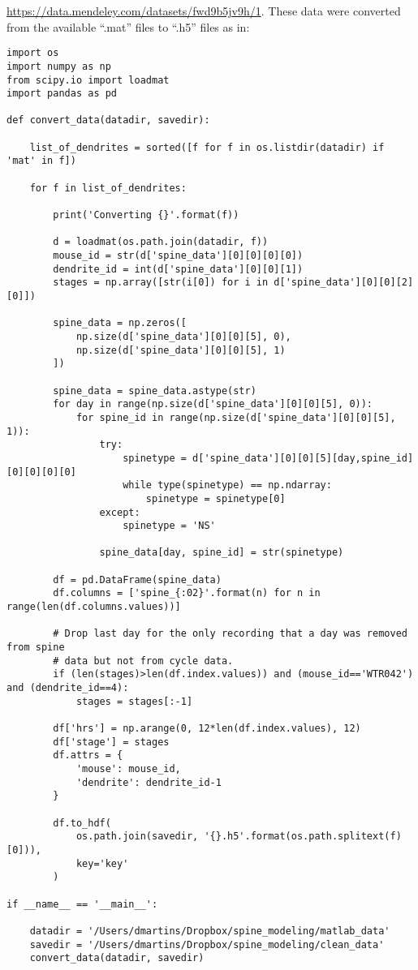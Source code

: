 \documentclass[11pt]{article}
\begin{document}
\noindent \href{https://data.mendeley.com/datasets/fwd9b5jv9h/1}{https://data.mendeley.com/datasets/fwd9b5jv9h/1}. These data were converted from the available ``.mat'' files to ``.h5'' files as in:
\footnotesize
\begin{Verbatim}[frame=single]
import os
import numpy as np
from scipy.io import loadmat
import pandas as pd

def convert_data(datadir, savedir):

    list_of_dendrites = sorted([f for f in os.listdir(datadir) if 'mat' in f])

    for f in list_of_dendrites:
    
        print('Converting {}'.format(f))
        
        d = loadmat(os.path.join(datadir, f))
        mouse_id = str(d['spine_data'][0][0][0][0])
        dendrite_id = int(d['spine_data'][0][0][1])
        stages = np.array([str(i[0]) for i in d['spine_data'][0][0][2][0]])

        spine_data = np.zeros([
            np.size(d['spine_data'][0][0][5], 0),
            np.size(d['spine_data'][0][0][5], 1)
        ])
        
        spine_data = spine_data.astype(str)
        for day in range(np.size(d['spine_data'][0][0][5], 0)):
            for spine_id in range(np.size(d['spine_data'][0][0][5], 1)):
                try:
                    spinetype = d['spine_data'][0][0][5][day,spine_id][0][0][0][0]
                    while type(spinetype) == np.ndarray:
                        spinetype = spinetype[0]
                except:
                    spinetype = 'NS'
                    
                spine_data[day, spine_id] = str(spinetype)

        df = pd.DataFrame(spine_data)
        df.columns = ['spine_{:02}'.format(n) for n in range(len(df.columns.values))]
        
        # Drop last day for the only recording that a day was removed from spine
        # data but not from cycle data.
        if (len(stages)>len(df.index.values)) and (mouse_id=='WTR042') and (dendrite_id==4):
            stages = stages[:-1]

        df['hrs'] = np.arange(0, 12*len(df.index.values), 12)
        df['stage'] = stages
        df.attrs = {
            'mouse': mouse_id,
            'dendrite': dendrite_id-1
        }

        df.to_hdf(
            os.path.join(savedir, '{}.h5'.format(os.path.splitext(f)[0])),
            key='key'
        )
        
if __name__ == '__main__':

    datadir = '/Users/dmartins/Dropbox/spine_modeling/matlab_data'
    savedir = '/Users/dmartins/Dropbox/spine_modeling/clean_data'
    convert_data(datadir, savedir)
    
\end{Verbatim}
\end{document}
